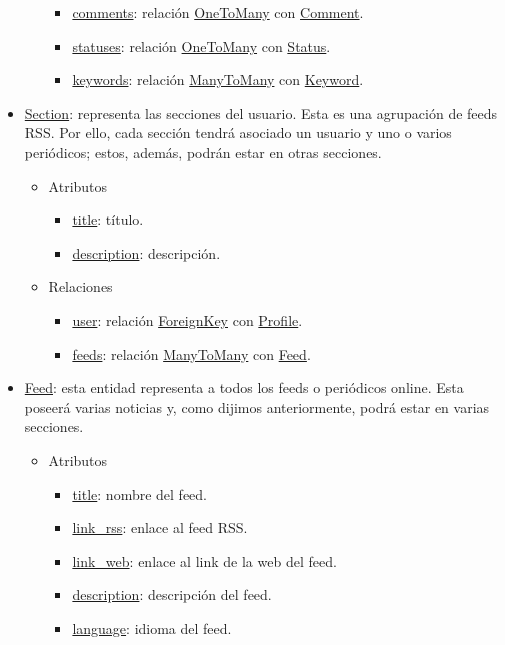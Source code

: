 \begin{itemize}
\begin{itemize}
\begin{itemize}
            \item \underline{comments}: relación \underline{OneToMany} con \underline{Comment}.
            \item \underline{statuses}: relación \underline{OneToMany} con \underline{Status}.
            \item \underline{keywords}: relación \underline{ManyToMany} con \underline{Keyword}.
        \end{itemize}
    \end{itemize}
    \item \underline{Section}: representa las secciones del usuario. Esta es una agrupación de feeds RSS. Por ello, cada sección tendrá asociado un usuario y uno o varios periódicos; estos, además, podrán estar en otras secciones.
    \begin{itemize}
        \item Atributos
        \begin{itemize}
            \item \underline{title}: título.
            \item \underline{description}: descripción.
        \end{itemize}
        \item Relaciones
        \begin{itemize}
            \item \underline{user}: relación \underline{ForeignKey} con \underline{Profile}.
            \item \underline{feeds}: relación \underline{ManyToMany} con \underline{Feed}.
        \end{itemize}
    \end{itemize}
    \item \underline{Feed}: esta entidad representa a todos los feeds o periódicos online. Esta poseerá varias noticias y, como dijimos anteriormente, podrá estar en varias secciones.
    \begin{itemize}
        \item Atributos
        \begin{itemize}
            \item \underline{title}: nombre del feed.
            \item \underline{link\_rss}: enlace al feed RSS.
            \item \underline{link\_web}: enlace al link de la web del feed.
            \item \underline{description}: descripción del feed.
            \item \underline{language}: idioma del feed.

\end{itemize}
\end{itemize}
\end{itemize}
